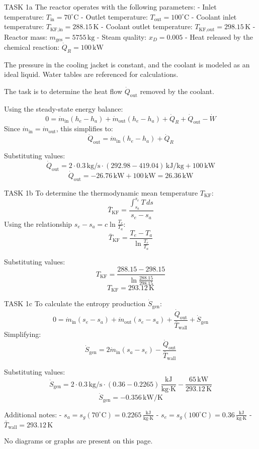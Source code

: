 TASK 1a  
The reactor operates with the following parameters:  
- Inlet temperature: \( T_{\text{in}} = 70^\circ\text{C} \)  
- Outlet temperature: \( T_{\text{out}} = 100^\circ\text{C} \)  
- Coolant inlet temperature: \( T_{\text{KF,in}} = 288.15 \, \text{K} \)  
- Coolant outlet temperature: \( T_{\text{KF,out}} = 298.15 \, \text{K} \)  
- Reactor mass: \( m_{\text{ges}} = 5755 \, \text{kg} \)  
- Steam quality: \( x_D = 0.005 \)  
- Heat released by the chemical reaction: \( \dot{Q}_R = 100 \, \text{kW} \)  

The pressure in the cooling jacket is constant, and the coolant is modeled as an ideal liquid. Water tables are referenced for calculations.  

The task is to determine the heat flow \( \dot{Q}_{\text{out}} \) removed by the coolant.  

Using the steady-state energy balance:  
\[
0 = \dot{m}_{\text{in}} (h_e - h_a) + \dot{m}_{\text{out}} (h_e - h_a) + \dot{Q}_R + \dot{Q}_{\text{out}} - \dot{W}
\]  
Since \( \dot{m}_{\text{in}} = \dot{m}_{\text{out}} \), this simplifies to:  
\[
\dot{Q}_{\text{out}} = \dot{m}_{\text{in}} (h_e - h_a) + \dot{Q}_R
\]  

Substituting values:  
\[
\dot{Q}_{\text{out}} = 2 \cdot 0.3 \, \text{kg/s} \cdot (292.98 - 419.04) \, \text{kJ/kg} + 100 \, \text{kW}
\]  
\[
\dot{Q}_{\text{out}} = -26.76 \, \text{kW} + 100 \, \text{kW} = 26.36 \, \text{kW}
\]  

TASK 1b  
To determine the thermodynamic mean temperature \( T_{\text{KF}} \):  
\[
\bar{T}_{\text{KF}} = \frac{\int_{s_a}^{s_e} T \, ds}{s_e - s_a}
\]  
Using the relationship \( s_e - s_a = c \ln \frac{T_e}{T_a} \):  
\[
\bar{T}_{\text{KF}} = \frac{T_e - T_a}{\ln \frac{T_e}{T_a}}
\]  

Substituting values:  
\[
T_{\text{KF}} = \frac{288.15 - 298.15}{\ln \frac{288.15}{298.15}}
\]  
\[
T_{\text{KF}} = 293.12 \, \text{K}
\]  

TASK 1c  
To calculate the entropy production \( \dot{S}_{\text{gen}} \):  
\[
0 = \dot{m}_{\text{in}} (s_e - s_a) + \dot{m}_{\text{out}} (s_e - s_a) + \frac{\dot{Q}_{\text{out}}}{\bar{T}_{\text{wall}}} + \dot{S}_{\text{gen}}
\]  
Simplifying:  
\[
\dot{S}_{\text{gen}} = 2 \dot{m}_{\text{in}} (s_a - s_e) - \frac{\dot{Q}_{\text{out}}}{\bar{T}_{\text{wall}}}
\]  

Substituting values:  
\[
\dot{S}_{\text{gen}} = 2 \cdot 0.3 \, \text{kg/s} \cdot (0.36 - 0.2265) \, \frac{\text{kJ}}{\text{kg·K}} - \frac{65 \, \text{kW}}{293.12 \, \text{K}}
\]  
\[
\dot{S}_{\text{gen}} = -0.356 \, \text{kW/K}
\]  

Additional notes:  
- \( s_a = s_g(70^\circ\text{C}) = 0.2265 \, \frac{\text{kJ}}{\text{kg·K}} \)  
- \( s_e = s_g(100^\circ\text{C}) = 0.36 \, \frac{\text{kJ}}{\text{kg·K}} \)  
- \( \bar{T}_{\text{wall}} = 293.12 \, \text{K} \)  

No diagrams or graphs are present on this page.